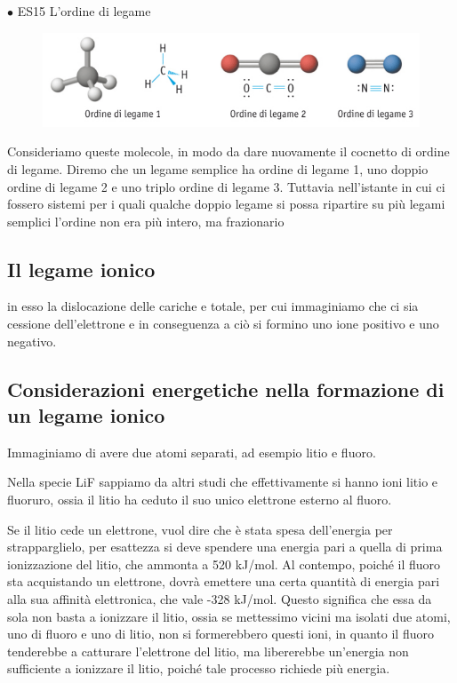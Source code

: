 \vspace{0.2cm}$\bullet$ ES15 L'ordine di legame
\begin{figure}[htp]
    \centering
    \includegraphics[width=14cm]{immagini/ordine-di-legame.png}
\end{figure}

Consideriamo queste molecole, in modo da dare nuovamente il cocnetto di ordine di legame. Diremo che un legame semplice ha ordine di legame 1, uno doppio ordine di legame 2 e uno triplo ordine di legame 3. Tuttavia nell'istante in cui ci fossero sistemi per i quali qualche doppio legame si possa ripartire su più legami semplici l'ordine non era più intero, ma frazionario
\subsection{Il legame ionico}
in esso la dislocazione delle cariche e totale, per cui immaginiamo che ci sia cessione dell'elettrone e in conseguenza a ciò si formino uno ione positivo e uno negativo.

\subsection{Considerazioni energetiche nella formazione di un legame ionico}
Immaginiamo di avere due atomi separati, ad esempio litio e fluoro.

Nella specie LiF sappiamo da altri studi che effettivamente si hanno ioni litio e fluoruro, ossia il litio ha ceduto il suo unico elettrone esterno al fluoro.

Se il litio cede un elettrone, vuol dire che è stata spesa dell'energia per strapparglielo, per esattezza si deve spendere una energia pari a quella di prima ionizzazione del litio, che ammonta a 520 kJ/mol.
Al contempo, poiché il fluoro sta acquistando un elettrone, dovrà emettere una certa quantità di energia pari alla sua affinità elettronica, che vale -328 kJ/mol. Questo significa che essa da sola non basta a ionizzare il litio, ossia se mettessimo vicini ma isolati due atomi, uno di fluoro e uno di litio, non si formerebbero questi ioni, in quanto il fluoro tenderebbe a catturare l'elettrone del litio, ma libererebbe un'energia non sufficiente a ionizzare il litio, poiché tale processo richiede più energia.

